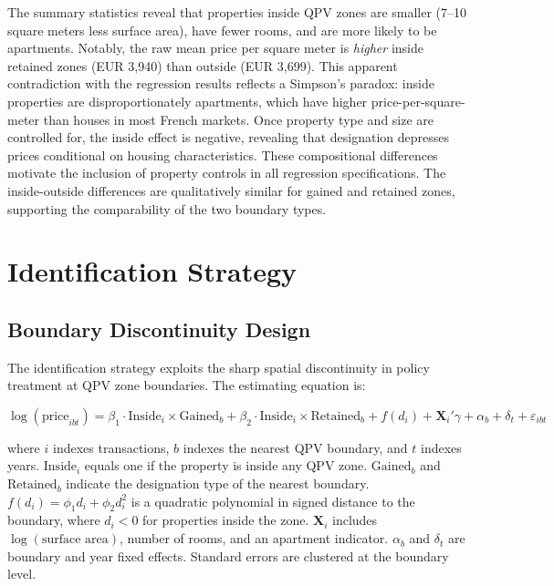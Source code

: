 \documentclass[12pt]{article}
\begin{document}
The summary statistics reveal that properties inside QPV zones are smaller (7--10 square meters less surface area), have fewer rooms, and are more likely to be apartments. Notably, the raw mean price per square meter is \textit{higher} inside retained zones (EUR 3,940) than outside (EUR 3,699). This apparent contradiction with the regression results reflects a Simpson's paradox: inside properties are disproportionately apartments, which have higher price-per-square-meter than houses in most French markets. Once property type and size are controlled for, the inside effect is negative, revealing that designation depresses prices conditional on housing characteristics. These compositional differences motivate the inclusion of property controls in all regression specifications. The inside-outside differences are qualitatively similar for gained and retained zones, supporting the comparability of the two boundary types.


\section{Identification Strategy} \label{sec:identification}

\subsection{Boundary Discontinuity Design}

The identification strategy exploits the sharp spatial discontinuity in policy treatment at QPV zone boundaries. The estimating equation is:

\begin{equation} \label{eq:main}
\log(\text{price}_{ibt}) = \beta_1 \cdot \text{Inside}_i \times \text{Gained}_b + \beta_2 \cdot \text{Inside}_i \times \text{Retained}_b + f(d_i) + \mathbf{X}_i'\gamma + \alpha_b + \delta_t + \varepsilon_{ibt}
\end{equation}

\noindent where $i$ indexes transactions, $b$ indexes the nearest QPV boundary, and $t$ indexes years. $\text{Inside}_i$ equals one if the property is inside any QPV zone. $\text{Gained}_b$ and $\text{Retained}_b$ indicate the designation type of the nearest boundary. $f(d_i) = \phi_1 d_i + \phi_2 d_i^2$ is a quadratic polynomial in signed distance to the boundary, where $d_i < 0$ for properties inside the zone. $\mathbf{X}_i$ includes $\log(\text{surface area})$, number of rooms, and an apartment indicator. $\alpha_b$ and $\delta_t$ are boundary and year fixed effects. Standard errors are clustered at the boundary level.
\end{document}
